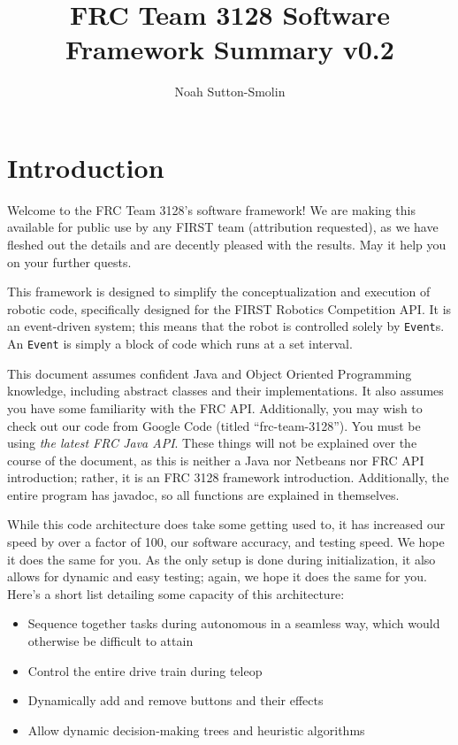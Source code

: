 \documentclass[a4paper]{article}
\title{FRC Team 3128 Software Framework Summary v0.2}
\author{Noah Sutton-Smolin}
\begin{document}
\maketitle\tableofcontents\pagebreak

\section{Introduction} Welcome to the FRC Team 3128's software framework! We are making this available for public use by any FIRST team (attribution requested), as we have fleshed out the details and are decently pleased with the results. May it help you on your further quests.

This framework is designed to simplify the conceptualization and execution of robotic code, specifically designed for the FIRST Robotics Competition API. It is an event-driven system; this means that the robot is controlled solely by \lstinline{Event}s. An \lstinline{Event} is simply a block of code which runs at a set interval. 

This document assumes confident Java and Object Oriented Programming knowledge, including abstract classes and their implementations. It also assumes you have some familiarity with the FRC API. Additionally, you may wish to check out our code from Google Code (titled ``frc-team-3128''). You must be using \textit{the latest FRC Java API}. These things will not be explained over the course of the document, as this is neither a Java nor Netbeans nor FRC API introduction; rather, it is an FRC 3128 framework introduction. Additionally, the entire program has javadoc, so all functions are explained in themselves.

While this code architecture does take some getting used to, it has increased our speed by over a factor of 100, our software accuracy, and testing speed. We hope it does the same for you. As the only setup is done during initialization, it also allows for dynamic and easy testing; again, we hope it does the same for you. Here's a short list detailing some capacity of this architecture:

\begin{itemize}
	\item{Sequence together tasks during autonomous in a seamless way, which would otherwise be difficult to attain}
	\item{Control the entire drive train during teleop}
	\item{Dynamically add and remove buttons and their effects}
	\item{Allow dynamic decision-making trees and heuristic algorithms}
\end{itemize}
\end{document}
